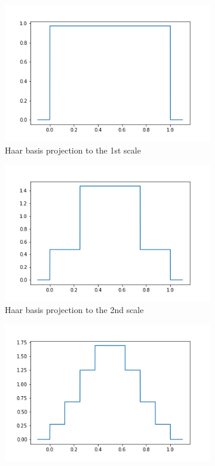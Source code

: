 \documentclass[../master_thesis.tex]{subfiles}
\begin{document}
\begin{figure}[h!]
  \centering
  \begin{subfigure}[b]{0.49\linewidth}
    \includegraphics[width=\linewidth]{img/scale1.png}
    \caption{Haar basis projection to the 1st scale}
  \end{subfigure}
  \begin{subfigure}[b]{0.49\linewidth}
    \includegraphics[width=\linewidth]{img/scale2.png}
    \caption{Haar basis projection to the 2nd scale}
  \end{subfigure}
  \begin{subfigure}[b]{0.49\linewidth}
    \includegraphics[width=\linewidth]{img/scale3.png}

\end{subfigure}
\end{figure}
\end{document}
